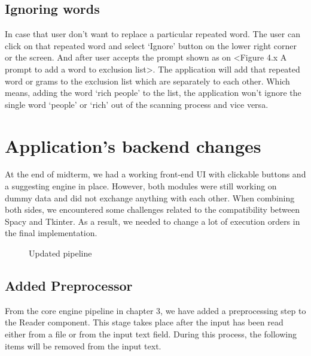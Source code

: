 \documentclass[12pt,oneside,openright,a4paper]{cpe-english-project}
\begin{document}
\subsection{Ignoring words}
In case that user don’t want to replace a particular repeated word. The user can click on that repeated word and select ‘Ignore’ button on the lower right corner or the screen. And after user accepts the prompt shown as on <Figure 4.x A prompt to add a word to exclusion list>. The application will add that repeated word or grams to the exclusion list which are separately to each other. Which means, adding the word ‘rich people’ to the list, the application won’t ignore the single word ‘people’ or ‘rich’ out of the scanning process and vice versa. 


\section{Application's backend changes}
At the end of midterm, we had a working front-end UI with clickable buttons and a suggesting engine in place. However, both modules were still working on dummy data and did not exchange anything with each other. When combining both sides, we encountered some challenges related to the compatibility between Spacy and Tkinter. As a result, we needed to change a lot of execution orders in the final implementation.
\begin{figure}[!h]\centering
\setlength{\fboxrule}{0.2mm} %
\setlength{\fboxsep}{1cm}
\caption{Updated pipeline}\label{fig:updated pipeline}
\end{figure}
\subsection{Added Preprocessor}
From the core engine pipeline in chapter 3, we have added a preprocessing step to the Reader component. This stage takes place after the input has been read either from a file or from the input text field. During this process, the following items will be removed from the input text.
\end{document}
